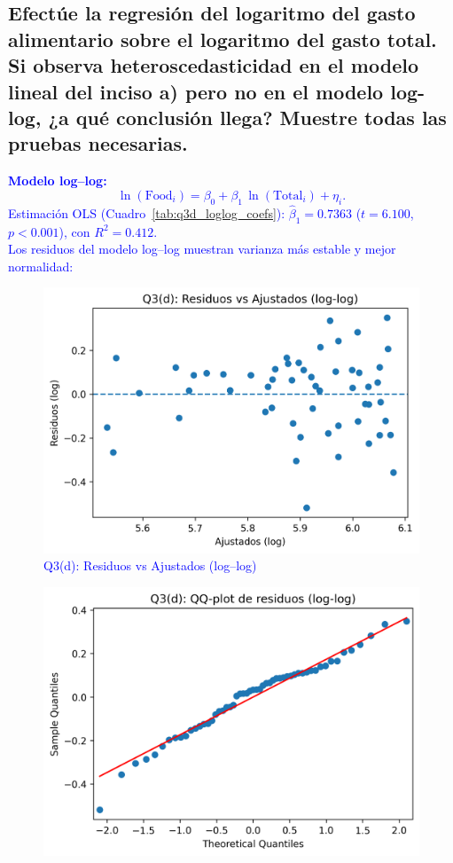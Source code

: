 \documentclass[10pt]{article}
\begin{document}
\subsection{Efectúe la regresión del logaritmo del gasto alimentario sobre el logaritmo del gasto total. Si observa heteroscedasticidad en el modelo lineal del inciso a) pero no en el modelo log-log, ¿a qué conclusión llega? Muestre todas las pruebas necesarias.}
    \textcolor{blue}{
        \textbf{Modelo log–log:}
        \begin{equation*}
        \ln(\text{Food}_i) = \beta_0 + \beta_1\,\ln(\text{Total}_i) + \eta_i.
        \end{equation*}
        Estimación OLS (Cuadro~\ref{tab:q3d_loglog_coefs}): \(\hat\beta_1=0.7363\) (\(t=6.100\), $p<0.001$), con \(R^2=0.412\).\\
        
        Los residuos del modelo log–log muestran varianza más estable y mejor normalidad:
        \begin{figure}[H]
            \centering
            \includegraphics[width=0.7\linewidth]{../plots/python/ex3/q3_d_loglog_resid_vs_fitted.png}
            \caption{Q3(d): Residuos vs Ajustados (log–log)}
            \label{fig:q3_d_resid}
        \end{figure}
        \begin{figure}[H]
            \centering
            \includegraphics[width=0.7\linewidth]{../plots/python/ex3/q3_d_loglog_resid_qqplot.png}

\end{figure}}
\end{document}
